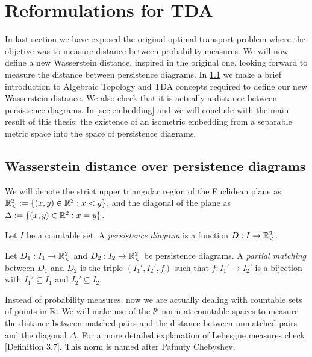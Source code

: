 \section{Reformulations for TDA} \label{sec:tda}

In last section we have exposed the original optimal transport problem where the objetive was to measure distance between probability measures. We will now define a new Wasserstein distance, inspired in the original one, looking forward to measure the distance between persistence diagrams. In \ref{sec:wp-persistance} we make a brief introduction to Algebraic Topology and TDA concepts required to define our new Wasserstein distance. We also check that it is actually a distance between persistence diagrams. In \ref{sec:embedding} and we will conclude with the main result of this thesis: the existence of an isometric embedding from a separable metric space into the space of persistence diagrams.

\subsection{Wasserstein distance over persistence diagrams} \label{sec:wp-persistance}
We will denote the strict upper triangular region of the Euclidean plane as $ \mathbb{R}_<^2 := \{(x, y) \in \mathbb R^2 : x < y\} $, and the diagonal of the plane as $ \Delta := \{(x, y) \in \mathbb R^2 : x = y\}$.

\begin{definition}
    Let $ I $ be a countable set. A {\it persistence diagram} is a function $ D: I \to \mathbb{R}_<^2 $.
\end{definition}

\begin{definition}
    Let $ D_1: I_1 \to \mathbb{R}_<^2 $ and $ D_2: I_2 \to \mathbb{R}_<^2 $ be persistence diagrams. A {\it partial matching} between $ D_1 $ and $ D_2 $ is the triple $ (I_1', I_2', f) $ such that $ f: I_1' \to I_2' $ is a bijection with $ I_1' \subseteq I_1 $ and $ I_2' \subseteq I_2 $.
\end{definition}

Instead of probability measures, now we are actually dealing with countable sets of points in $ \mathbb R $. We will make use of the $ l^p $ norm at countable spaces to measure the distance between matched pairs and the distance between unmatched pairs and the diagonal $ \Delta $. For a more detailed explanation of Lebesgue measures check \cite{rudin}[Definition 3.7]. This norm is named after Pafnuty Chebyshev.

